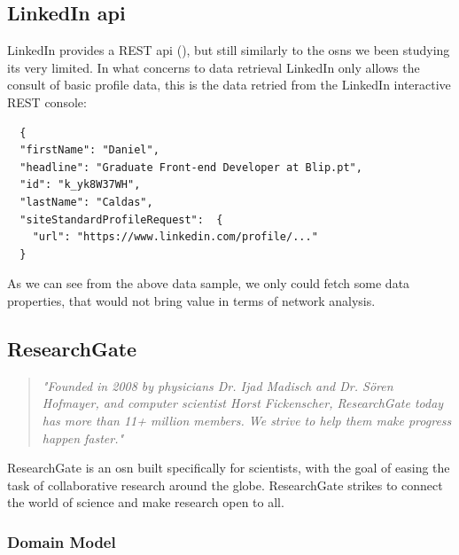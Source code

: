 \subsection*{LinkedIn \gls{api}}
LinkedIn provides a REST \gls{api} (\cite{linkapi}), but still similarly to the \glspl{osn} we been studying its very limited. In what concerns to data retrieval LinkedIn only allows
the consult of basic profile data, this is the data retried from the LinkedIn interactive REST console:\\

\begin{verbatim}
  {
  "firstName": "Daniel",
  "headline": "Graduate Front-end Developer at Blip.pt",
  "id": "k_yk8W37WH",
  "lastName": "Caldas",
  "siteStandardProfileRequest":  {
    "url": "https://www.linkedin.com/profile/..."
  }
\end{verbatim}

\indent As we can see from the above data sample, we only could fetch some data properties, that would not bring value in terms of network analysis.

\subsection{ResearchGate}

\begin{quote}
\textit{"Founded in 2008 by physicians Dr. Ijad Madisch and Dr. Sören Hofmayer, and computer scientist
Horst Fickenscher, ResearchGate today has more than 11+ million members. We strive to help them make progress happen faster."} \cite{rgate}
\end{quote}

ResearchGate is an \gls{osn} built specifically for scientists, with the goal of easing the task of collaborative research around the globe. ResearchGate
strikes to connect the world of science and make research open to all.
\clearpage

\subsubsection*{Domain Model}

